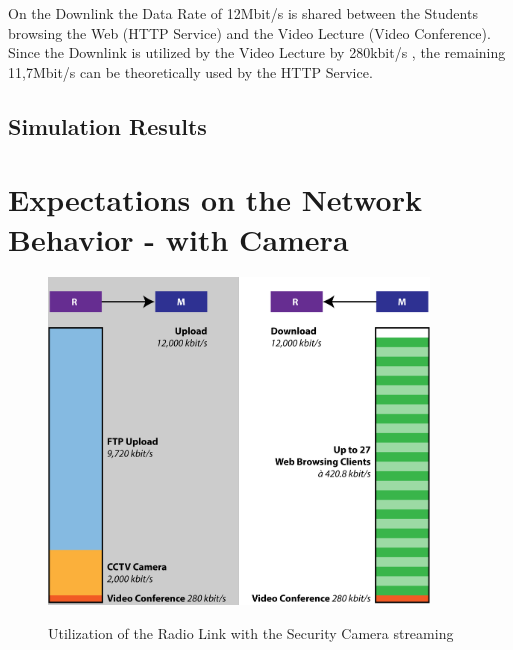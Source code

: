 \documentclass[a4paper,10pt]{book}
\begin{document}
On the Downlink the Data Rate of 12Mbit/s is shared between the Students browsing the Web (HTTP Service) and the Video Lecture (Video Conference).
Since the Downlink is utilized by the Video Lecture by 280kbit/s , the remaining 11,7Mbit/s 
can be theoretically used by the HTTP Service.




\subsection{Simulation Results}






\section{Expectations on the Network Behavior - with Camera}


\begin{figure}[!ht]
  \centering
    \includegraphics[width=0.9\textwidth]{graphics-01.png}
    \label{fig:g1}
    \caption{Utilization of the Radio Link with the Security Camera streaming}
\end{figure}
\end{document}
